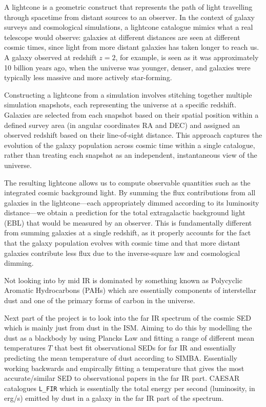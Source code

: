 \documentclass[a4paper, 11pt, oneside]{researchjournal} %
\begin{document}
A lightcone is a geometric construct that represents the path of light travelling through spacetime from distant sources to an observer. In the context of galaxy surveys and cosmological simulations, a lightcone catalogue mimics what a real telescope would observe: galaxies at different distances are seen at different cosmic times, since light from more distant galaxies has taken longer to reach us. A galaxy observed at redshift $z = 2$, for example, is seen as it was approximately 10 billion years ago, when the universe was younger, denser, and galaxies were typically less massive and more actively star-forming.

Constructing a lightcone from a simulation involves stitching together multiple simulation snapshots, each representing the universe at a specific redshift. Galaxies are selected from each snapshot based on their spatial position within a defined survey area (in angular coordinates RA and DEC) and assigned an observed redshift based on their line-of-sight distance. This approach captures the evolution of the galaxy population across cosmic time within a single catalogue, rather than treating each snapshot as an independent, instantaneous view of the universe.

The resulting lightcone allows us to compute observable quantities such as the integrated cosmic background light. By summing the flux contributions from all galaxies in the lightcone---each appropriately dimmed according to its luminosity distance---we obtain a prediction for the total extragalactic background light (EBL) that would be measured by an observer. This is fundamentally different from summing galaxies at a single redshift, as it properly accounts for the fact that the galaxy population evolves with cosmic time and that more distant galaxies contribute less flux due to the inverse-square law and cosmological dimming.

Not looking into by mid IR is dominated by something known as Polycyclic Aromatic Hydrocarbons (PAHs) which are essentially components of interstellar dust and one of the primary forms of carbon in the universe. 

Next part of the project is to look into the far IR spectrum of the cosmic SED which is mainly just from dust in the ISM. Aiming to do this by modelling the dust as a blackbody by using Plancks Law and fitting a range of different mean temperatures $T$ that best fit observational SEDs for far IR and essentially predicting the mean temperature of dust according to SIMBA. Essentially working backwards and empircally fitting a temperature that gives the most accurate/similar SED to observational papers in the far IR part. CAESAR catalogues \texttt{L\_FIR} which is essentially the total energy per second (luminosity, in erg/s) emitted by dust in a galaxy in the far IR part of the spectrum. 
\end{document}
